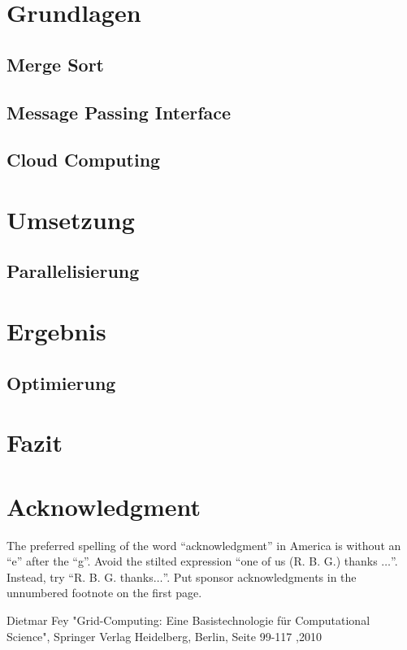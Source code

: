 \documentclass[conference]{IEEEtran}
\begin{document}
\section{Grundlagen}

\subsection{Merge Sort}
 \subsection{Message Passing Interface}
 \subsection{Cloud Computing}
\section{Umsetzung}

\subsection{Parallelisierung}
\section{Ergebnis}
\subsection{Optimierung}

\section{Fazit}

\section*{Acknowledgment}

The preferred spelling of the word ``acknowledgment'' in America is without 
an ``e'' after the ``g''. Avoid the stilted expression ``one of us (R. B. 
G.) thanks $\ldots$''. Instead, try ``R. B. G. thanks$\ldots$''. Put sponsor 
acknowledgments in the unnumbered footnote on the first page.


\begin{thebibliography}{00}
 Dietmar Fey "Grid-Computing: Eine Basistechnologie für Computational Science", Springer Verlag Heidelberg, Berlin, Seite 99-117 ,2010
\end{thebibliography}
\end{document}
